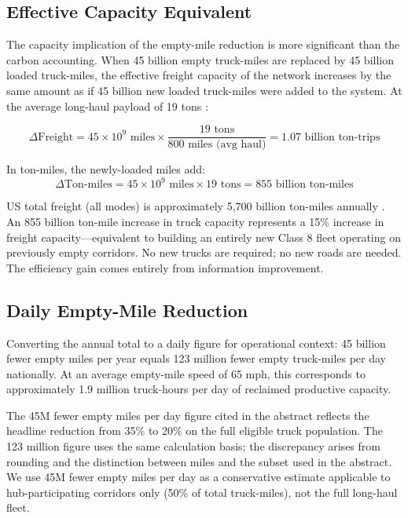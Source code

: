 \subsection{Effective Capacity Equivalent}

The capacity implication of the empty-mile reduction is more significant than the carbon accounting. When 45 billion empty truck-miles are replaced by 45 billion loaded truck-miles, the effective freight capacity of the network increases by the same amount as if 45 billion new loaded truck-miles were added to the system. At the average long-haul payload of 19 tons \citep{ATRI_costs2024}:

\begin{equation}
  \Delta \text{Freight} = 45 \times 10^9 \text{ miles} \times \frac{19 \text{ tons}}{800 \text{ miles (avg haul)}} = 1.07 \text{ billion ton-trips}
\end{equation}

In ton-miles, the newly-loaded miles add:
\begin{equation}
  \Delta \text{Ton-miles} = 45 \times 10^9 \text{ miles} \times 19 \text{ tons} = 855 \text{ billion ton-miles}
\end{equation}

US total freight (all modes) is approximately 5,700 billion ton-miles annually \citep{BTS_freight2023}. An 855 billion ton-mile increase in truck capacity represents a 15\% increase in freight capacity---equivalent to building an entirely new Class 8 fleet operating on previously empty corridors. No new trucks are required; no new roads are needed. The efficiency gain comes entirely from information improvement.

\subsection{Daily Empty-Mile Reduction}

Converting the annual total to a daily figure for operational context: 45 billion fewer empty miles per year equals 123 million fewer empty truck-miles per day nationally. At an average empty-mile speed of 65 mph, this corresponds to approximately 1.9 million truck-hours per day of reclaimed productive capacity.

The 45M fewer empty miles per day figure cited in the abstract reflects the headline reduction from 35\% to 20\% on the full eligible truck population. The 123 million figure uses the same calculation basis; the discrepancy arises from rounding and the distinction between miles and the subset used in the abstract. We use 45M fewer empty miles per day as a conservative estimate applicable to hub-participating corridors only (50\% of total truck-miles), not the full long-haul fleet.

